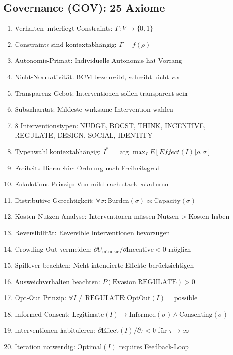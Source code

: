 \subsection{Governance (GOV): 25 Axiome}
\begin{enumerate}[label=MA-GOV-\arabic*:, leftmargin=3cm]
    \item Verhalten unterliegt Constraints: $\Gamma: V \rightarrow \{0, 1\}$
    \item Constraints sind kontextabhängig: $\Gamma = f(\rho)$
    \item Autonomie-Primat: Individuelle Autonomie hat Vorrang
    \item Nicht-Normativität: BCM beschreibt, schreibt nicht vor
    \item Transparenz-Gebot: Interventionen sollen transparent sein
    \item Subsidiarität: Mildeste wirksame Intervention wählen
    \item 8 Interventionstypen: NUDGE, BOOST, THINK, INCENTIVE, REGULATE, DESIGN, SOCIAL, IDENTITY
    \item Typenwahl kontextabhängig: $I^* = \arg\max_{I} E[Effect(I)|\rho, \sigma]$
    \item Freiheits-Hierarchie: Ordnung nach Freiheitsgrad
    \item Eskalations-Prinzip: Von mild nach stark eskalieren
    \item Distributive Gerechtigkeit: $\forall \sigma: \text{Burden}(\sigma) \propto \text{Capacity}(\sigma)$
    \item Kosten-Nutzen-Analyse: Interventionen müssen Nutzen > Kosten haben
    \item Reversibilität: Reversible Interventionen bevorzugen
    \item Crowding-Out vermeiden: $\partial U_{\text{intrinsic}}/\partial \text{Incentive} < 0$ möglich
    \item Spillover beachten: Nicht-intendierte Effekte berücksichtigen
    \item Ausweichverhalten beachten: $P(\text{Evasion}|\text{REGULATE}) > 0$
    \item Opt-Out Prinzip: $\forall I \neq \text{REGULATE}: \text{OptOut}(I) = \text{possible}$
    \item Informed Consent: $\text{Legitimate}(I) \rightarrow \text{Informed}(\sigma) \wedge \text{Consenting}(\sigma)$
    \item Interventionen habituieren: $\partial \text{Effect}(I)/\partial \tau < 0$ für $\tau \rightarrow \infty$
    \item Iteration notwendig: $\text{Optimal}(I)$ requires Feedback-Loop

\end{enumerate}
